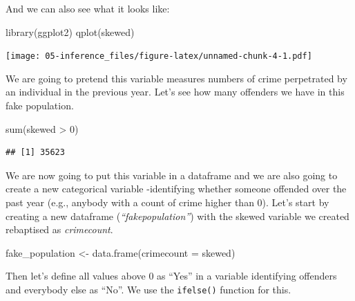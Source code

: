 \documentclass[
]{book}
\newenvironment{Shaded}{\begin{snugshade}}{\end{snugshade}}
\newcommand{\AttributeTok}[1]{\textcolor[rgb]{0.77,0.63,0.00}{#1}}
\newcommand{\CommentTok}[1]{\textcolor[rgb]{0.56,0.35,0.01}{\textit{#1}}}
\newcommand{\DecValTok}[1]{\textcolor[rgb]{0.00,0.00,0.81}{#1}}
\newcommand{\FunctionTok}[1]{\textcolor[rgb]{0.00,0.00,0.00}{#1}}
\newcommand{\NormalTok}[1]{#1}
\newcommand{\OtherTok}[1]{\textcolor[rgb]{0.56,0.35,0.01}{#1}}
\newcommand{\SpecialCharTok}[1]{\textcolor[rgb]{0.00,0.00,0.00}{#1}}
\newcommand{\StringTok}[1]{\textcolor[rgb]{0.31,0.60,0.02}{#1}}
\begin{document}
And we can also see what it looks like:

\begin{Shaded}
\begin{Highlighting}[]
\FunctionTok{library}\NormalTok{(ggplot2)}
\FunctionTok{qplot}\NormalTok{(skewed)}
\end{Highlighting}
\end{Shaded}

\texttt{[image: 05-inference\_files/figure-latex/unnamed-chunk-4-1.pdf]}

We are going to pretend this variable measures numbers of crime perpetrated by an individual in the previous year. Let's see how many offenders we have in this fake population.

\begin{Shaded}
\begin{Highlighting}[]
\FunctionTok{sum}\NormalTok{(skewed }\SpecialCharTok{\textgreater{}} \DecValTok{0}\NormalTok{)}
\end{Highlighting}
\end{Shaded}

\begin{verbatim}
## [1] 35623
\end{verbatim}

We are now going to put this variable in a dataframe and we are also going to create a new categorical variable -identifying whether someone offended over the past year (e.g., anybody with a count of crime higher than 0). Let's start by creating a new dataframe (\emph{``fakepopulation''}) with the skewed variable we created rebaptised as \emph{crimecount}.

\begin{Shaded}
\begin{Highlighting}[]
\NormalTok{fake\_population }\OtherTok{\textless{}{-}} \FunctionTok{data.frame}\NormalTok{(}\AttributeTok{crimecount =}\NormalTok{ skewed)}
\end{Highlighting}
\end{Shaded}

Then let's define all values above 0 as ``Yes'' in a variable identifying offenders and everybody else as ``No''. We use the \texttt{ifelse()} function for this.

\begin{Shaded}
\end{Shaded}
\end{document}
